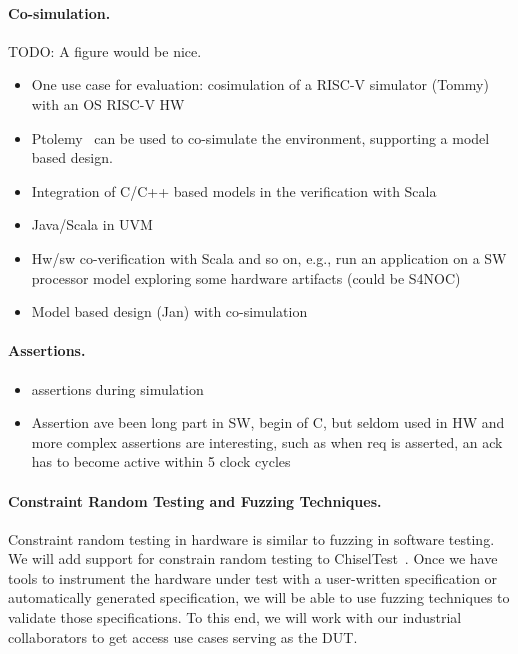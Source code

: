 \documentclass[conference]{IEEEtran}
\newcommand{\todo}[1]{{\color{olive} TODO: #1}}
\begin{document}
\paragraph{Co-simulation.}

\todo{A figure would be nice.}

\begin{itemize}
\item One use case for evaluation: cosimulation of a RISC-V simulator (Tommy) with an OS RISC-V HW 
\item Ptolemy~\cite{ptolemyII-book} can be used to co-simulate the environment, supporting a model based design.
\item Integration of C/C++ based models in the verification with Scala
\item Java/Scala in UVM
\item Hw/sw co-verification with Scala and so on, e.g., run an application on a SW processor model exploring some hardware artifacts (could be S4NOC)
\item Model based design (Jan) with co-simulation
\end{itemize}

\paragraph{Assertions.}

\begin{itemize}
\item assertions during simulation
\item Assertion ave been long part in SW, begin of C, but seldom used in HW and more complex assertions are interesting, such as when req is asserted, an ack has to become active within 5 clock cycles
\end{itemize}

\paragraph{Constraint Random Testing and Fuzzing Techniques.}

Constraint random testing in hardware is similar to fuzzing in software testing.
We will add support for constrain random testing to ChiselTest~\cite{chisel:tester2}.
Once we have tools to instrument the hardware under test with a user-written
specification or automatically generated specification, we will be able to use fuzzing techniques
to validate those specifications. To this end, we will work
with our industrial collaborators to get access use cases serving
as the DUT.
\end{document}
